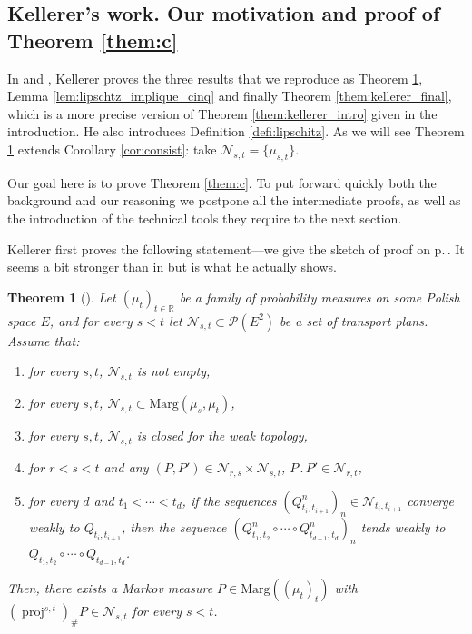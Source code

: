 \documentclass[JEP,XML,SOM,Unicode,NoEqCountersInSection,NoFloatCountersInSection,published]{cedram}
\renewcommand{\theenumi}{\alph{enumi}}
\renewcommand{\theenumii}{\roman{enumii}}
\newenvironment{enumeratei}
{\bgroup\def\theenumi{\roman{enumi}}\def\theenumii{\arabic{enumii}}\begin{enumerate}}
{\end{enumerate}\egroup}
\newcommand{\ldot}{\mathbin{.}}
\theoremstyle{plain}
\newtheorem{them}{Theorem}[section]
\theoremstyle{definition}
\newcommand{\p}{\mathcal{P}}
\newcommand{\ma}{\mathrm{Marg}}
\newcommand{\R}{\mathbb{R}}
\newcommand{\pr}{\operatorname{proj}}
\begin{document}
\subsection{Kellerer's work. Our motivation and proof of Theorem \ref{them:c}}\label{subsec:proof_kelsto}

In \cite{Ke72} and \cite{Ke73}, Kellerer proves the three results that we reproduce as Theorem \ref{them:existence}, Lemma \ref{lem:lipschtz_implique_cinq} and finally Theorem \ref{them:kellerer_final}, which is a more precise version of Theorem \ref{them:kellerer_intro} given in the introduction. He also introduces Definition \ref{defi:lipschitz}. As we will see Theorem \ref{them:existence} extends Corollary \ref{cor:consist}: take $\mathcal{N}_{s,t}=\{\mu_{s,t}\}$.

Our goal here is to prove Theorem \ref{them:c}. To put forward quickly both the background and our reasoning we postpone all the intermediate proofs, as well as the introduction of the technical tools they require to the next section.

Kellerer first proves the following statement---we give the sketch of proof on p.\,\pageref{proof:them:existence}. It seems a bit stronger than in \cite{Ke72} but is what he actually shows.

\begin{them}[{\cite[Th.\,1]{Ke72}}]\label{them:existence}
Let $(\mu_t)_{t\in \R}$ be a family of probability measures on some Polish space $E$, and for every $s< t$ let $\mathcal{N}_{s,t}\subset\p(E^2)$ be a set of transport plans.
Assume that:
\begin{enumeratei}
\item\label{them:existence1}
for every $s,t$, $\mathcal{N}_{s,t}$ is not empty,
\item\label{them:existence2}
for every $s,t$, $\mathcal{N}_{s,t}\subset\ma(\mu_s,\mu_t)$,
\item\label{them:existence3}
for every $s,t$, $\mathcal{N}_{s,t}$ is closed for the weak topology,
\item\label{them:existence4}
for $r<s<t$ and any $(P,P')\in\mathcal{N}_{r,s}\times \mathcal{N}_{s,t}$, $P\ldot P'\in\mathcal{N}_{r,t}$,
\item\label{them:existence5}
 for every $d$ and $t_1<\cdots<t_d$, if the sequences $(Q^n_{t_i,t_{i+1}})_n\in \mathcal{N}_{t_i,t_{i+1}}$ converge weakly to $Q_{t_i,t_{i+1}}$, then the sequence $(Q^n_{t_1,t_2}\circ\cdots \circ Q^n_{t_{d-1},t_d})_{n}$ tends weakly to $Q_{t_1,t_2}\circ\cdots \circ Q_{t_{d-1},t_d}$.
\end{enumeratei}

Then, there exists a Markov measure $P\in\ma((\mu_t)_t)$ with $(\pr^{s,t})_\#P \in \mathcal{N}_{s,t}$ for every $s<t$.
\end{them}
\end{document}
